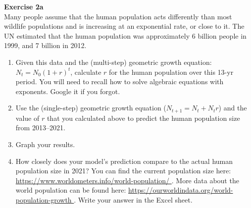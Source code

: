 \documentclass[12pt]{article}\usepackage[]{graphicx}\usepackage[]{xcolor}
\begin{document}
\clearpage









{\bf Exercise 2a \\}
Many people assume that the human population acts differently than
most wildlife populations and is increasing at an exponential rate, or
close to it. The UN estimated that the human population was approximately 6
billion people in 1999, and 7 billion in 2012. 

\begin{enumerate}
  \item Given this data and the (multi-step) geometric growth equation:
    $N_t = N_0(1+r)^t$, calculate $r$ for the human population over
    this 13-yr period. You will need to recall how to solve algebraic
    equations with exponents. Google it if you forgot.
  \item Use the (single-step) geometric growth equation ($N_{t+1} = N_t + N_t r$)
    and the value of $r$ that you calculated above to predict the
    human population size from 2013--2021.
  \item Graph your results.
  \item How closely does your model's prediction compare to the actual
    human population size in 2021? You can find the current population
    size here: \url{
      https://www.worldometers.info/world-population/
    }. More data about the world population can be found here: \url{
      https://ourworldindata.org/world-population-growth      
    }. Write your answer in the Excel sheet.
\end{enumerate}
\end{document}

